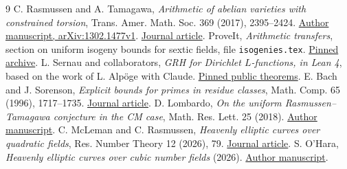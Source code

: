 \documentclass[11pt]{article}
\begin{document}
\begin{thebibliography}{9}
 C. Rasmussen and A. Tamagawa,
\emph{Arithmetic of abelian varieties with constrained torsion},
Trans. Amer. Math. Soc. 369 (2017), 2395--2424.
\href{https://arxiv.org/abs/1302.1477}{Author manuscript, arXiv:1302.1477v1}.
\href{https://doi.org/10.1090/tran/6790}{Journal article}.
 ProveIt, \emph{Arithmetic transfers}, section on
uniform isogeny bounds for sextic fields, file \texttt{isogenies.tex}.
\href{https://github.com/VladimirReshetnikov/ProveIt/blob/b65aa6229415bdb66d9ce52decc4e997793cd07d/docs/incoming/grh-arithmetic-transfers.zip}{Pinned archive}.
 L. Sernau and collaborators, \emph{GRH for Dirichlet
$L$-functions, in Lean 4}, based on the work of L. Alp\"oge with Claude.
\href{https://github.com/lsernau/grh-lean/blob/72fead102f663d5c7a407964a13dc0cf9d977207/grh/src/Main.lean}{Pinned public theorems}.
 E. Bach and J. Sorenson, \emph{Explicit bounds for primes
in residue classes}, Math. Comp. 65 (1996), 1717--1735.
\href{https://doi.org/10.1090/S0025-5718-96-00763-6}{Journal article}.
 D. Lombardo, \emph{On the uniform
Rasmussen--Tamagawa conjecture in the CM case}, Math. Res. Lett. 25
(2018). \href{https://arxiv.org/abs/1511.09019}{Author manuscript}.
 C. McLeman and C. Rasmussen, \emph{Heavenly elliptic
curves over quadratic fields}, Res. Number Theory 12 (2026), 79.
\href{https://doi.org/10.1007/s40993-026-00757-8}{Journal article}.
 S. O'Hara, \emph{Heavenly elliptic curves over cubic
number fields} (2026). \href{https://arxiv.org/abs/2609.35642}{Author manuscript}.
\end{thebibliography}
\end{document}
